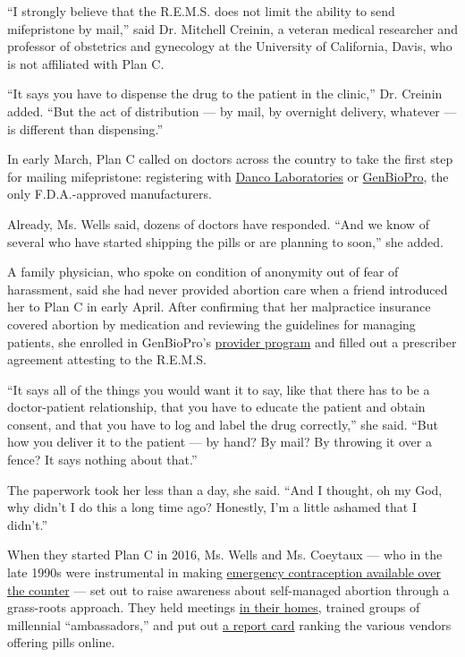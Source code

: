``I strongly believe that the R.E.M.S. does not limit the ability to
send mifepristone by mail,'' said Dr. Mitchell Creinin, a veteran
medical researcher and professor of obstetrics and gynecology at the
University of California, Davis, who is not affiliated with Plan C.

``It says you have to dispense the drug to the patient in the clinic,''
Dr. Creinin added. ``But the act of distribution --- by mail, by
overnight delivery, whatever --- is different than dispensing.''

In early March, Plan C called on doctors across the country to take the
first step for mailing mifepristone: registering with
\href{https://www.nytimes3xbfgragh.onion/2000/09/30/us/abortion-pill-distributor-energized-by-new-mission.html}{Danco
Laboratories} or \href{https://genbiopro.com/prescribing/}{GenBioPro},
the only F.D.A.-approved manufacturers.

Already, Ms. Wells said, dozens of doctors have responded. ``And we know
of several who have started shipping the pills or are planning to
soon,'' she added.

A family physician, who spoke on condition of anonymity out of fear of
harassment, said she had never provided abortion care when a friend
introduced her to Plan C in early April. After confirming that her
malpractice insurance covered abortion by medication and reviewing the
guidelines for managing patients, she enrolled in GenBioPro's
\href{https://genbiopro.com/ordering/}{provider program} and filled out
a prescriber agreement attesting to the R.E.M.S.

``It says all of the things you would want it to say, like that there
has to be a doctor-patient relationship, that you have to educate the
patient and obtain consent, and that you have to log and label the drug
correctly,'' she said. ``But how you deliver it to the patient --- by
hand? By mail? By throwing it over a fence? It says nothing about
that.''

The paperwork took her less than a day, she said. ``And I thought, oh my
God, why didn't I do this a long time ago? Honestly, I'm a little
ashamed that I didn't.''

When they started Plan C in 2016, Ms. Wells and Ms. Coeytaux --- who in
the late 1990s were instrumental in making
\href{https://www.whijournal.com/article/S1049-3867(00)00072-4/fulltext}{emergency
contraception available over the counter} --- set out to raise awareness
about self-managed abortion through a grass-roots approach. They held
meetings
\href{https://www.nytimes3xbfgragh.onion/2017/04/27/opinion/spreading-plan-c-to-end-pregnancy.html?_r=0}{in
their homes}, trained groups of millennial ``ambassadors,'' and put out
\href{http://cdn.cnn.com/cnn/2018/images/10/22/plancreportcardnew.pdf}{a
report card} ranking the various vendors offering pills online.

